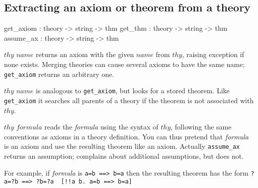 \subsection{Extracting an axiom or theorem from a theory}
\begin{ttbox}
get_axiom : theory -> string -> thm
get_thm   : theory -> string -> thm
assume_ax : theory -> string -> thm
\end{ttbox}
\begin{ttdescription}
\item[\ttindexbold{get_axiom} $thy$ $name$]
  returns an axiom with the given $name$ from $thy$, raising exception
   if none exists.  Merging theories can cause several axioms
  to have the same name; {\tt get_axiom} returns an arbitrary one.

\item[\ttindexbold{get_thm} $thy$ $name$]
  is analogous to {\tt get_axiom}, but looks for a stored theorem. Like
  {\tt get_axiom} it searches all parents of a theory if the theorem
  is not associated with $thy$.

\item[\ttindexbold{assume_ax} $thy$ $formula$]
  reads the {\it formula} using the syntax of $thy$, following the same
  conventions as axioms in a theory definition.  You can thus pretend that
  {\it formula} is an axiom and use the resulting theorem like an axiom.
  Actually {\tt assume_ax} returns an assumption;  
  complains about additional assumptions, but  does not.

For example, if {\it formula} is
\hbox{\tt a=b ==> b=a} then the resulting theorem has the form
\hbox{\verb'?a=?b ==> ?b=?a  [!!a b. a=b ==> b=a]'}
\end{ttdescription}

